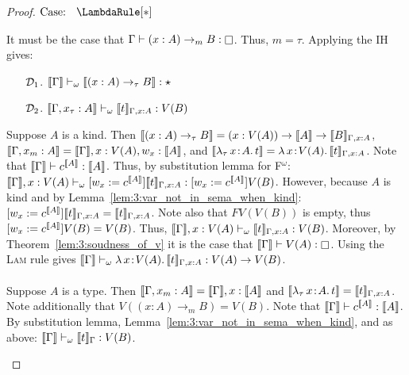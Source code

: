 \begin{proof}
    $\text{Case: }\begin{array}{c} \LambdaRule[*] \end{array}$
    \begin{proofcase}
        It must be the case that $\Gamma \vdash (x : A) \to_m B : \kind$.
        Thus, $m = \tau$.
        Applying the IH gives:
        \begin{enumerate}
            \item[$\mathcal{D}_{1}$.] $\llbracket \Gamma \rrbracket \vdash_\omega \llbracket (x : A) \to_\tau B \rrbracket : \star$
            \item[$\mathcal{D}_{2}$.] $\llbracket \Gamma, x_\tau : A \rrbracket \vdash_\omega \llbracket t \rrbracket_{\Gamma, x:A} : V(B)$ 
        \end{enumerate}
        Suppose $A$ is a kind.
        Then $\llbracket (x : A) \to_\tau B \rrbracket = (x : V(A)) \to \llbracket A \rrbracket \to \llbracket B \rrbracket_{\Gamma,x:A}$, $\llbracket \Gamma, x_m : A \rrbracket = \llbracket \Gamma \rrbracket, x : V(A), w_x : \llbracket A \rrbracket$, and $\llbracket {\lambda_\tau}\, x\! : \! A.\, t \rrbracket = {\lambda}\, x\! : \! V(A).\, \llbracket t \rrbracket_{\Gamma,x:A}$.
        Note that $\llbracket \Gamma \rrbracket \vdash c^{\llbracket A \rrbracket} : \llbracket A \rrbracket$.
        Thus, by substitution lemma for F$^\omega$: $\llbracket \Gamma \rrbracket, x : V(A) \vdash_\omega [w_x := c^{\llbracket A \rrbracket}]\llbracket t \rrbracket_{\Gamma, x:A} : [w_x := c^{\llbracket A \rrbracket}]V(B)$.
        However, because $A$ is kind and by Lemma~\ref{lem:3:var_not_in_sema_when_kind}: $[w_x := c^{\llbracket A \rrbracket}]\llbracket t \rrbracket_{\Gamma, x:A} = \llbracket t \rrbracket_{\Gamma, x:A}$.
        Note also that $FV(V(B))$ is empty, thus $[w_x := c^{\llbracket A \rrbracket}]V(B) = V(B)$.
        Thus, $\llbracket \Gamma \rrbracket, x : V(A) \vdash_\omega \llbracket t \rrbracket_{\Gamma, x:A} : V(B)$.
        Moreover, by Theorem~\ref{lem:3:soudness_of_v} it is the case that $\sema{\Gamma} \vdash V(A) : \kind$.
        Using the \textsc{Lam} rule gives $\llbracket \Gamma \rrbracket \vdash_\omega {\lambda}\, x\! : \! V(A).\, \llbracket t \rrbracket_{\Gamma, x:A} : V(A) \to V(B)$.
        \\ \\
        Suppose $A$ is a type.
        Then $\llbracket \Gamma, x_m : A \rrbracket = \llbracket \Gamma \rrbracket, x : \llbracket A \rrbracket$ and $\llbracket {\lambda_\tau}\, x\! : \! A.\, t \rrbracket = \llbracket t \rrbracket_{\Gamma,x:A}$.
        Note additionally that $V((x : A) \to_m B) = V(B)$.
        Note that $\llbracket \Gamma \rrbracket \vdash c^{\llbracket A \rrbracket} : \llbracket A \rrbracket$.
        By substitution lemma, Lemma~\ref{lem:3:var_not_in_sema_when_kind}, and as above: $\llbracket \Gamma \rrbracket \vdash_\omega \llbracket t \rrbracket_{\Gamma} : V(B)$.
    \end{proofcase}


\end{proof}
